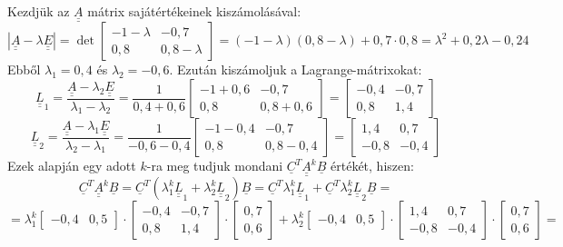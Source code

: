 \documentclass[12pt,a4paper]{article}
\newcommand\uuline[1]{\underline{\underline{#1}}}
\newcommand\uline[1]{\underline{#1}}
\begin{document}
Kezdjük az $\uuline{A}$ mátrix sajátértékeinek kiszámolásával:
\[|\uuline{A}-\lambda \uuline{E}| = \det\left[\begin{matrix}-1-\lambda & -0,7\\0,8 & 0,8-\lambda\end{matrix}\right] = (-1-\lambda)(0,8-\lambda)+0,7\cdot 0,8 = \lambda^2 +0,2\lambda -0,24\]
Ebből $\lambda_1 = 0,4$ és $\lambda_2 = -0,6$. Ezután kiszámoljuk a Lagrange-mátrixokat:
\[\uuline{L}_1 = \frac{\uuline{A}-\lambda_2\uuline{E}}{\lambda_1-\lambda_2} = \frac{1}{0,4+0,6}\left[\begin{matrix}-1+0,6 & -0,7\\0,8 & 0,8+0,6\end{matrix}\right] = \left[\begin{matrix}-0,4 & -0,7\\0,8 & 1,4\end{matrix}\right]\]
\[\uuline{L}_2 = \frac{\uuline{A}-\lambda_1\uuline{E}}{\lambda_2-\lambda_1} = \frac{1}{-0,6-0,4}\left[\begin{matrix}-1-0,4 & -0,7\\0,8 & 0,8-0,4\end{matrix}\right] = \left[\begin{matrix}1,4 & 0,7\\-0,8 & -0,4\end{matrix}\right]\]
Ezek alapján egy adott $k$-ra meg tudjuk mondani $\uline{C}^T\uuline{A}^k\uline{B}$ értékét, hiszen:
\[\uline{C}^T\uuline{A}^k\uline{B} = \uline{C}^T(\lambda_1^k\uuline{L}_1+\lambda_2^k\uuline{L}_2)\uline{B} = \uline{C}^T\lambda_1^k\uuline{L}_1+\uline{C}^T\lambda_2^k\uuline{L}_2\uline{B}=\]
\[= \lambda_1^k\left[\begin{matrix}-0,4 & 0,5\end{matrix}\right]\cdot\left[\begin{matrix}-0,4 & -0,7\\0,8 & 1,4\end{matrix}\right]\cdot \left[\begin{matrix}0,7\\0,6\end{matrix}\right] + \lambda_2^k\left[\begin{matrix}-0,4 & 0,5\end{matrix}\right]\cdot\left[\begin{matrix}1,4 & 0,7\\-0,8 & -0,4\end{matrix}\right]\cdot \left[\begin{matrix}0,7\\0,6\end{matrix}\right] = \]
\end{document}
